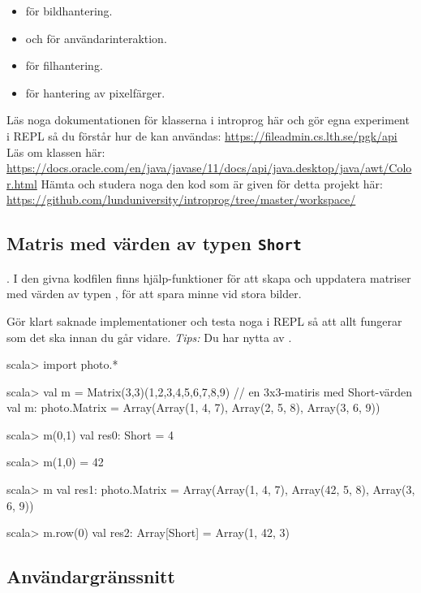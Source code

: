 \begin{itemize}
\item {} för bildhantering.
\item {} och  för användarinteraktion.
\item {} för filhantering.
\item {} för hantering av pixelfärger.
\end{itemize}
Läs noga dokumentationen för klasserna i introprog här och gör egna experiment i REPL så du förstår hur de kan användas: 
\url{https://fileadmin.cs.lth.se/pgk/api}\\
Läs om klassen  här:\\\url{https://docs.oracle.com/en/java/javase/11/docs/api/java.desktop/java/awt/Color.html}
Hämta och studera noga den kod som är given för detta projekt här:\\
\url{https://github.com/lunduniversity/introprog/tree/master/workspace/}

\subsection{Matris med värden av typen \texttt{Short}}

\Task \textbf{}.
I den givna kodfilen  finns hjälp-funktioner för att skapa och uppdatera matriser med värden av typen , för att spara minne vid stora bilder.  

Gör klart saknade implementationer och testa noga i REPL så att allt fungerar som det ska innan du går vidare. \emph{Tips:} Du har nytta av . 
\begin{REPLsmall}
scala> import photo.*

scala> val m = Matrix(3,3)(1,2,3,4,5,6,7,8,9) // en 3x3-matiris med Short-värden
val m: photo.Matrix = Array(Array(1, 4, 7), Array(2, 5, 8), Array(3, 6, 9))

scala> m(0,1)
val res0: Short = 4

scala> m(1,0) = 42

scala> m
val res1: photo.Matrix = Array(Array(1, 4, 7), Array(42, 5, 8), Array(3, 6, 9))

scala> m.row(0)
val res2: Array[Short] = Array(1, 42, 3)
\end{REPLsmall}

\subsection{Användargränssnitt}

